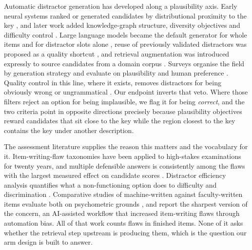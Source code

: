 \documentclass[11pt]{article}
\begin{document}
Automatic distractor generation has developed along a plausibility axis. Early neural systems ranked or generated candidates by distributional proximity to the key \citep{qiu2020automatic,chung2020bertbased,zhou2020coattention,maurya2020distract}, and later work added knowledge-graph structure, diversity objectives and difficulty control \citep{ren2021knowledgedriven,xie2021diverse,kumar2023novel}. Large language models became the default generator for whole items and for distractor slots alone \citep{feng2024exploring,bitew2024distractor,fernandez2024divert,cavusoglu2024disgem}, reuse of previously validated distractors was proposed as a quality shortcut \citep{bitew2022learning}, and retrieval augmentation was introduced expressly to source candidates from a domain corpus \citep{yu2024enhancing,n2025retrievalaugmented}. Surveys organise the field by generation strategy and evaluate on plausibility and human preference \citep{alhazmi2024distractor,awalurahman2024automatic}. Quality control in this line, where it exists, removes distractors for being obviously wrong or ungrammatical \citep{offerijns2020better}. Our endpoint inverts that veto. Where those filters reject an option for being implausible, we flag it for being \emph{correct}, and the two criteria point in opposite directions precisely because plausibility objectives reward candidates that sit close to the key while the region closest to the key contains the key under another description.

The assessment literature supplies the reason this matters and the vocabulary for it. Item-writing-flaw taxonomies have been applied to high-stakes examinations for twenty years, and multiple defensible answers is consistently among the flaws with the largest measured effect on candidate scores \citep{tarrant2006frequency,rezigalla2024item,chiavaroli2017negativelyworded}. Distractor efficiency analysis quantifies what a non-functioning option does to difficulty and discrimination \citep{rezigalla2024item}. Comparative studies of machine-written against faculty-written items evaluate both on psychometric grounds \citep{doughty2024comparative,grevisse2024docimological,laupichler2023large,tran2023generating,kyak2026validity}, and \citet{automation2026bias} report the sharpest version of the concern, an AI-assisted workflow that increased item-writing flaws through automation bias. All of that work counts flaws in finished items. None of it asks whether the retrieval step upstream is producing them, which is the question our arm design is built to answer.
\end{document}
